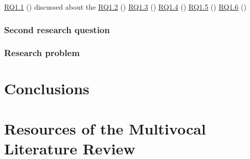 \documentclass[english, 12pt, a4paper, sci, utf8, a-1b, online]{aaltothesis}
\begin{document}
\hyperref[RQ1.1]{RQ1.1} (\rqonepointone) discussed about the
\hyperref[RQ1.2]{RQ1.2} (\rqonepointtwo)
\hyperref[RQ1.3]{RQ1.3} (\rqonepointthree)
\hyperref[RQ1.4]{RQ1.4} (\rqonepointfour)
\hyperref[RQ1.5]{RQ1.5} (\rqonepointfive)
\hyperref[RQ1.6]{RQ1.6} (\rqonepointsix)

\subsubsection{Second research question}

\subsubsection{Research problem}

\clearpage
\section{Conclusions}

\clearpage
\thesisbibliography
\printbibliography

\clearpage
\thesisappendix

\section{Resources of the Multivocal Literature Review \label{mlr-resources}}

\renewcommand{\arraystretch}{1.5}
\end{document}
